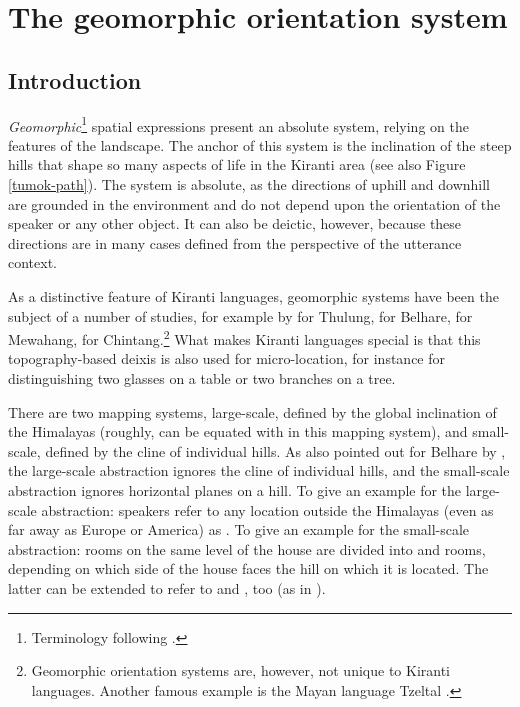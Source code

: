 \chapter{The geomorphic orientation system}\label{ch-geomorphic}

\section{Introduction}

\emph{Geomorphic}\footnote{Terminology following \citet{Bickel1997Spatial}.} spatial expressions present an absolute system, relying on the features of the landscape. The anchor of this system is the inclination of the steep hills that shape so many aspects of life in the Kiranti area (see also Figure \ref{tumok-path}). The system is absolute, as the directions of uphill and downhill are grounded in the environment and do not depend upon the orientation of the speaker or any other object. It can also be deictic, however, because these directions are in many cases defined from the perspective of the utterance context. 

As a distinctive  feature of Kiranti languages, geomorphic systems have been the subject of a number of studies, for example by \citet{Allen1972The-vertical} for Thulung, \citet{Bickel1994Mapping, Bickel1999Cultural, Bickel1997Spatial, Bickel2001Deictic} for Belhare, \citet{Gaenszle1999Travelling} for Mewahang, \citet{Dirksmeyer2008Spatial} for Chintang.\footnote{Geomorphic orientation systems are, however, not unique to Kiranti languages. Another famous example is the Mayan language Tzeltal \citep{Brownetal1993Uphill}.} What makes Kiranti languages special is that this topography-based deixis is also used for micro-location, for instance for distinguishing two glasses on a table or two branches on a tree. 

There are two mapping systems, large-scale, defined by the global inclination of the Himalayas (roughly,  can be equated with  in this mapping system), and small-scale, defined by the cline of individual hills. As also pointed out for Belhare by \citet[55]{Bickel1997Spatial}, the large-scale abstraction ignores the cline of individual hills, and the small-scale abstraction ignores horizontal planes on a hill. To give an example for the large-scale abstraction: speakers refer to any location outside the Himalayas (even as far away as Europe or America) as . To give an example for the small-scale abstraction: rooms on the same level of the house are divided into  and  rooms, depending on which side of the house faces the hill on which it is located. The latter can be extended to refer to  and , too (as in ). 

